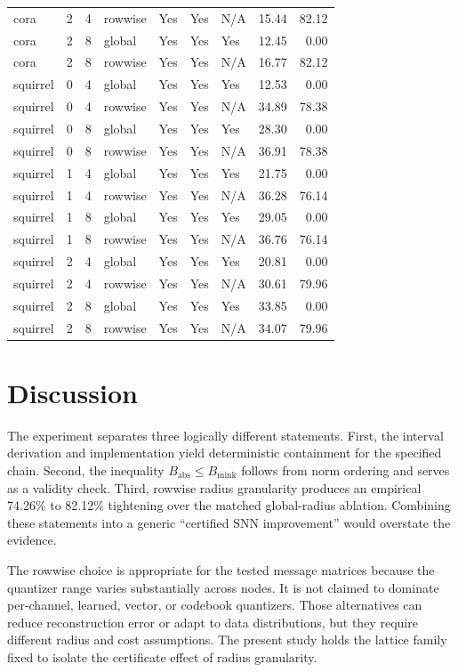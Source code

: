 \documentclass{article}
\begin{document}
\begin{table}[ht]
{\begin{tabular}{lrrllllrr}
cora & 2 & 4 & rowwise & Yes & Yes & N/A & 15.44 & 82.12 \\
cora & 2 & 8 & global & Yes & Yes & Yes & 12.45 & 0.00 \\
cora & 2 & 8 & rowwise & Yes & Yes & N/A & 16.77 & 82.12 \\
squirrel & 0 & 4 & global & Yes & Yes & Yes & 12.53 & 0.00 \\
squirrel & 0 & 4 & rowwise & Yes & Yes & N/A & 34.89 & 78.38 \\
squirrel & 0 & 8 & global & Yes & Yes & Yes & 28.30 & 0.00 \\
squirrel & 0 & 8 & rowwise & Yes & Yes & N/A & 36.91 & 78.38 \\
squirrel & 1 & 4 & global & Yes & Yes & Yes & 21.75 & 0.00 \\
squirrel & 1 & 4 & rowwise & Yes & Yes & N/A & 36.28 & 76.14 \\
squirrel & 1 & 8 & global & Yes & Yes & Yes & 29.05 & 0.00 \\
squirrel & 1 & 8 & rowwise & Yes & Yes & N/A & 36.76 & 76.14 \\
squirrel & 2 & 4 & global & Yes & Yes & Yes & 20.81 & 0.00 \\
squirrel & 2 & 4 & rowwise & Yes & Yes & N/A & 30.61 & 79.96 \\
squirrel & 2 & 8 & global & Yes & Yes & Yes & 33.85 & 0.00 \\
squirrel & 2 & 8 & rowwise & Yes & Yes & N/A & 34.07 & 79.96 \\
\bottomrule
\end{tabular}
}
\end{table}

\section{Discussion}

\label{sec:discussion}

The experiment separates three logically different statements. First, the interval derivation and implementation yield deterministic containment for the specified chain. Second, the inequality \(B_{\mathrm{abs}}\le B_{\mathrm{mink}}\) follows from norm ordering and serves as a validity check. Third, rowwise radius granularity produces an empirical 74.26\% to 82.12\% tightening over the matched global-radius ablation. Combining these statements into a generic ``certified SNN improvement'' would overstate the evidence.

The rowwise choice is appropriate for the tested message matrices because the quantizer range varies substantially across nodes. It is not claimed to dominate per-channel, learned, vector, or codebook quantizers. Those alternatives can reduce reconstruction error or adapt to data distributions, but they require different radius and cost assumptions. The present study holds the lattice family fixed to isolate the certificate effect of radius granularity.
\end{document}
